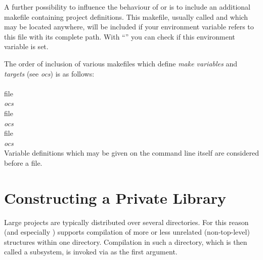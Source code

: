 A further possibility to influence the behaviour of  or
 is to include an additional makefile containing project
definitions. This makefile, usually called  and which
may be located anywhere, will be included if your environment variable
 refers to this file with its complete path. With
``'' you can check if this environment variable is set.


The order of inclusion of various makefiles which define \emph{make
  variables} and \emph{targets} 
(see {\it ocs\/}) is as follows:\\
\\
   file \\
  {\it ocs\/} \\
   file \\
  {\it ocs\/} \\
   file \\
  {\it ocs\/} \\

Variable definitions which may be given on the  command line
itself are considered before a  file.

\section{Constructing a Private Library}
\label{sec:privLib}
Large projects are
typically distributed over several directories. For this reason
 (and especially ) supports compilation of more or less
unrelated 
(non-top-level) \opal{} structures within one
directory. 
Compilation in such a directory, which is then called a
subsystem, is invoked via  as the first  argument.

